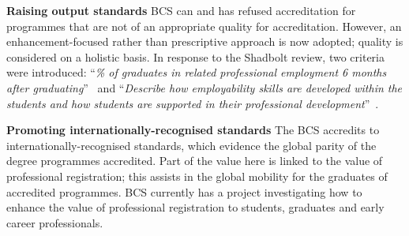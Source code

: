 \documentclass[sigconf]{acmart}
\begin{document}
{\textbf{Raising output standards}}
BCS can and has refused accreditation for programmes that are not of
an appropriate quality for accreditation. However, an
enhancement-focused rather than prescriptive approach is now adopted;
quality is considered on a holistic basis. In response to the Shadbolt
review, two criteria were introduced: ``{\emph{\% of graduates in
related professional employment 6 months after graduating}}''~\cite
[p8]{BCS2019b} and ``{\emph{Describe how employability skills are
developed within the students and how students are supported in their
professional development}}''~\cite [p3]{BCS2019b}.

{\textbf{Promoting internationally-recognised standards}} The BCS
accredits to internationally-recognised standards, which evidence the
global parity of the degree programmes accredited. Part of the value
here is linked to the value of professional registration; this assists
in the global mobility for the graduates of accredited programmes. BCS
currently has a project investigating how to enhance the value of
professional registration to students, graduates and early career
professionals.
\end{document}
